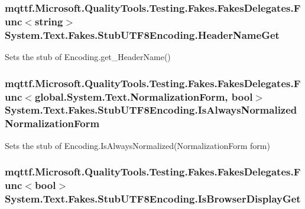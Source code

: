 \hypertarget{class_system_1_1_text_1_1_fakes_1_1_stub_u_t_f8_encoding_ab6331e2c7701e4e5507c0e186e9c4943}{
\subsubsection[{Header\-Name\-Get}]{\setlength{\rightskip}{0pt plus 5cm}mqttf.\-Microsoft.\-Quality\-Tools.\-Testing.\-Fakes.\-Fakes\-Delegates.\-Func$<$string$>$ System.\-Text.\-Fakes.\-Stub\-U\-T\-F8\-Encoding.\-Header\-Name\-Get}}\label{class_system_1_1_text_1_1_fakes_1_1_stub_u_t_f8_encoding_ab6331e2c7701e4e5507c0e186e9c4943}


Sets the stub of Encoding.\-get\-\_\-\-Header\-Name()

\hypertarget{class_system_1_1_text_1_1_fakes_1_1_stub_u_t_f8_encoding_aaeaf26c99bec61bbc167c67a8fbd9b83}{
\subsubsection[{Is\-Always\-Normalized\-Normalization\-Form}]{\setlength{\rightskip}{0pt plus 5cm}mqttf.\-Microsoft.\-Quality\-Tools.\-Testing.\-Fakes.\-Fakes\-Delegates.\-Func$<$global.\-System.\-Text.\-Normalization\-Form, bool$>$ System.\-Text.\-Fakes.\-Stub\-U\-T\-F8\-Encoding.\-Is\-Always\-Normalized\-Normalization\-Form}}\label{class_system_1_1_text_1_1_fakes_1_1_stub_u_t_f8_encoding_aaeaf26c99bec61bbc167c67a8fbd9b83}


Sets the stub of Encoding.\-Is\-Always\-Normalized(\-Normalization\-Form form)

\hypertarget{class_system_1_1_text_1_1_fakes_1_1_stub_u_t_f8_encoding_aaaaba93029cca6046e958ac1da43fb42}{
\subsubsection[{Is\-Browser\-Display\-Get}]{\setlength{\rightskip}{0pt plus 5cm}mqttf.\-Microsoft.\-Quality\-Tools.\-Testing.\-Fakes.\-Fakes\-Delegates.\-Func$<$bool$>$ System.\-Text.\-Fakes.\-Stub\-U\-T\-F8\-Encoding.\-Is\-Browser\-Display\-Get}}\label{class_system_1_1_text_1_1_fakes_1_1_stub_u_t_f8_encoding_aaaaba93029cca6046e958ac1da43fb42}


